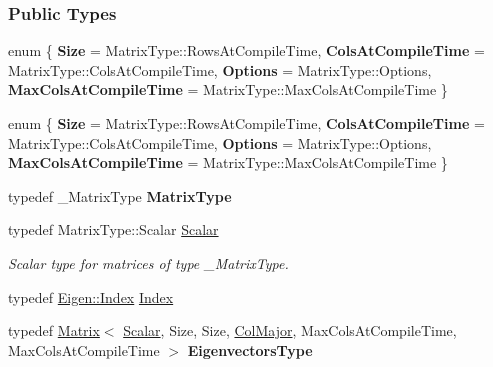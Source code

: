 \subsubsection*{Public Types}
\begin{DoxyCompactItemize}
\item 
\mbox{\label{group___eigenvalues___module_a6689e8405e398ca900bac6483d35702a}} 
enum \{ {\bfseries Size} = Matrix\+Type\+:\+:Rows\+At\+Compile\+Time, 
{\bfseries Cols\+At\+Compile\+Time} = Matrix\+Type\+:\+:Cols\+At\+Compile\+Time, 
{\bfseries Options} = Matrix\+Type\+:\+:Options, 
{\bfseries Max\+Cols\+At\+Compile\+Time} = Matrix\+Type\+:\+:Max\+Cols\+At\+Compile\+Time
 \}
\item 
\mbox{\label{group___eigenvalues___module_ad51441747d552c07d01573f40218142a}} 
enum \{ {\bfseries Size} = Matrix\+Type\+:\+:Rows\+At\+Compile\+Time, 
{\bfseries Cols\+At\+Compile\+Time} = Matrix\+Type\+:\+:Cols\+At\+Compile\+Time, 
{\bfseries Options} = Matrix\+Type\+:\+:Options, 
{\bfseries Max\+Cols\+At\+Compile\+Time} = Matrix\+Type\+:\+:Max\+Cols\+At\+Compile\+Time
 \}
\item 
\mbox{\label{group___eigenvalues___module_aa8238634587d40c56228848470acb4ef}} 
typedef \+\_\+\+Matrix\+Type {\bfseries Matrix\+Type}
\item 
\mbox{\label{group___eigenvalues___module_a0bfcedf4245b6846007ca4f01e4feb1f}} 
typedef Matrix\+Type\+::\+Scalar \hyperlink{group___eigenvalues___module_a0bfcedf4245b6846007ca4f01e4feb1f}{Scalar}
\begin{DoxyCompactList}\small\item\em Scalar type for matrices of type {\ttfamily \+\_\+\+Matrix\+Type}. \end{DoxyCompactList}\item 
typedef \hyperlink{namespace_eigen_a62e77e0933482dafde8fe197d9a2cfde}{Eigen\+::\+Index} \hyperlink{group___eigenvalues___module_a8a59ab7734b6eae2754fd78bc7c3a360}{Index}
\item 
\mbox{\label{group___eigenvalues___module_a0cbb16dc8baf4058188ea308fa37a803}} 
typedef \hyperlink{group___core___module_class_eigen_1_1_matrix}{Matrix}$<$ \hyperlink{group___eigenvalues___module_a0bfcedf4245b6846007ca4f01e4feb1f}{Scalar}, Size, Size, \hyperlink{group__enums_ggaacded1a18ae58b0f554751f6cdf9eb13a0cbd4bdd0abcfc0224c5fcb5e4f6669a}{Col\+Major}, Max\+Cols\+At\+Compile\+Time, Max\+Cols\+At\+Compile\+Time $>$ {\bfseries Eigenvectors\+Type}

\end{DoxyCompactItemize}
